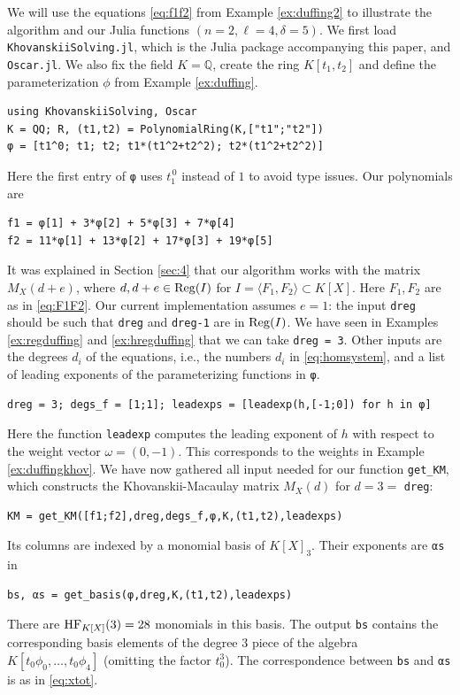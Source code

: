 \documentclass[12pt]{article}
\theoremstyle{definition}
\theoremstyle{remark}
\begin{document}
We will use the equations \eqref{eq:f1f2} from Example \ref{ex:duffing2} to illustrate the algorithm and our Julia functions $(n=2,\ell=4,\delta=5)$. We first load \texttt{KhovanskiiSolving.jl}, which is the Julia package accompanying this paper, and \texttt{Oscar.jl}. We also fix the field $K = \mathbb{Q}$, create the ring $K[t_1,t_2]$ and define the parameterization $\phi$ from Example \ref{ex:duffing}.
\begin{verbatim}
using KhovanskiiSolving, Oscar
K = QQ; R, (t1,t2) = PolynomialRing(K,["t1";"t2"])
φ = [t1^0; t1; t2; t1*(t1^2+t2^2); t2*(t1^2+t2^2)]
\end{verbatim}
Here the first entry of \texttt{φ} uses $t_1^{\, 0}$ instead of $1$ to avoid type issues. 
Our polynomials are
\begin{verbatim}
f1 = φ[1] + 3*φ[2] + 5*φ[3] + 7*φ[4]
f2 = 11*φ[1] + 13*φ[2] + 17*φ[3] + 19*φ[5]
\end{verbatim}
It was explained in Section \ref{sec:4} that our algorithm works with the matrix $M_X(d+e)$, where $d, d+e \in {\rm Reg}(I)$ for $I = \langle F_1, F_2 \rangle \subset K[X]$. Here $F_1, F_2$ are as in \eqref{eq:F1F2}. Our current implementation assumes $e = 1$: the input \texttt{dreg} should be such that \texttt{dreg} and \texttt{dreg-1} are in ${\rm Reg}(I)$. We have seen in Examples \ref{ex:regduffing} and \ref{ex:hregduffing} that we can take \texttt{dreg = 3}. Other inputs are the degrees $d_i$ of the equations, i.e., the numbers $d_i$ in \eqref{eq:homsystem}, and a list of leading exponents of the parameterizing functions in \texttt{φ}. 
\begin{verbatim}
dreg = 3; degs_f = [1;1]; leadexps = [leadexp(h,[-1;0]) for h in φ]
\end{verbatim}
Here the function \texttt{leadexp} computes the leading exponent of $h$ with respect to the weight vector $\omega = (0,-1)$. This corresponds to the weights in Example \ref{ex:duffingkhov}. We have now gathered all input needed for our function \texttt{get\_KM}, which constructs the Khovanskii-Macaulay matrix $M_X(d)$ for $d = 3 =$ \texttt{dreg}:
\begin{verbatim}
KM = get_KM([f1;f2],dreg,degs_f,φ,K,(t1,t2),leadexps)   
\end{verbatim}
Its columns are indexed by a monomial basis of $K[X]_3$. Their exponents are \texttt{αs} in 
\begin{verbatim}
bs, αs = get_basis(φ,dreg,K,(t1,t2),leadexps)
\end{verbatim}
There are ${\rm HF}_{K[X]}(3) = 28$ monomials in this basis. The output \texttt{bs} contains the corresponding basis elements of the degree $3$ piece of the algebra $K[t_0 \phi_0, \ldots, t_0 \phi_4]$ (omitting the factor $t_0^3$). The correspondence between \texttt{bs} and \texttt{αs} is as in \eqref{eq:xtot}. 
\end{document}

